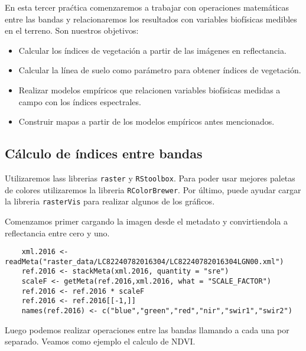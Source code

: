 En esta tercer pra\'ctica comenzaremos a trabajar con operaciones matem\'aticas
entre las bandas y relacionaremos los resultados con variables biof\'isicas medibles en el terreno. Son
nuestros objetivos:

\begin{itemize}
    \item Calcular los \'indices de vegetaci\'on a partir de las im\'agenes en
        reflectancia.
    \item Calcular la l\'inea de suelo como par\'ametro para obtener \'indices
        de vegetaci\'on.
    \item Realizar modelos emp\'iricos que relacionen variables biof\'isicas
        medidas a campo con los \'indices espectrales.
    \item Construir mapas a partir de los modelos emp\'iricos antes mencionados.
\end{itemize}


\subsection{C\'alculo de \'indices entre bandas}
Utilizaremos lass librerias \texttt{raster} y \texttt{RStoolbox}. Para
poder usar mejores paletas de colores utilizaremos la libreria
\texttt{RColorBrewer}. Por \'ultimo, puede ayudar cargar la libreria \texttt{rasterVis}
para realizar algunos de los gr\'aficos.

Comenzamos primer cargando la imagen desde el metadato y convirtiendola a
reflectancia entre cero y uno.

\begin{lstlisting}
    xml.2016 <- readMeta("raster_data/LC82240782016304/LC82240782016304LGN00.xml")
    ref.2016 <- stackMeta(xml.2016, quantity = "sre")
    scaleF <- getMeta(ref.2016,xml.2016, what = "SCALE_FACTOR")
    ref.2016 <- ref.2016 * scaleF
    ref.2016 <- ref.2016[[-1,]]
    names(ref.2016) <- c("blue","green","red","nir","swir1","swir2")
\end{lstlisting}

Luego podemos realizar operaciones entre las bandas llamando
a cada una por separado. Veamos como ejemplo el calculo de NDVI\@.

